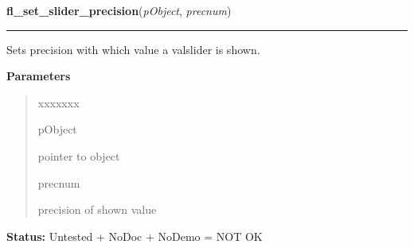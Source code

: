 \hspace{.8\funcindent}\begin{boxedminipage}{\funcwidth}

    \raggedright \textbf{fl\_set\_slider\_precision}(\textit{pObject}, \textit{precnum})

    \vspace{-1.5ex}

    \rule{\textwidth}{0.5\fboxrule}
\setlength{\parskip}{2ex}
    Sets precision with which value a valslider is shown.

\setlength{\parskip}{1ex}
      \textbf{Parameters}
      \vspace{-1ex}

      \begin{quote}
        \begin{Ventry}{xxxxxxx}

          \item[pObject]

          pointer to object

          \item[precnum]

          precision of shown value

        \end{Ventry}

      \end{quote}

\textbf{Status:} Untested + NoDoc + NoDemo = NOT OK



    \end{boxedminipage}

    \label{xformslib:library:fl_set_slider_filter}

    \vspace{0.5ex}

